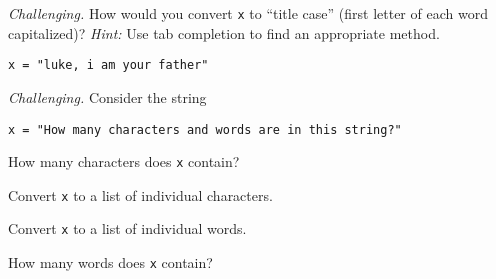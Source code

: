 \documentclass[11pt]{exam}
\begin{document}
\begin{questions}
\item {\it Challenging.\/}
How would you convert \texttt{x} to ``title case'' (first letter of each word capitalized)?
{\it Hint:\/} Use tab completion to find an appropriate method.
\begin{verbatim}
x = "luke, i am your father"
\end{verbatim}

\item {\it Challenging.\/} Consider the string 
\begin{verbatim}
x = "How many characters and words are in this string?"
\end{verbatim}
\begin{parts}
\item How many characters does \texttt{x} contain?    
\item Convert \texttt{x} to a list of individual characters.
\item Convert \texttt{x} to a list of individual words.    
\item How many words does \texttt{x} contain?  
\end{parts}





%

\end{questions}


\end{document}
